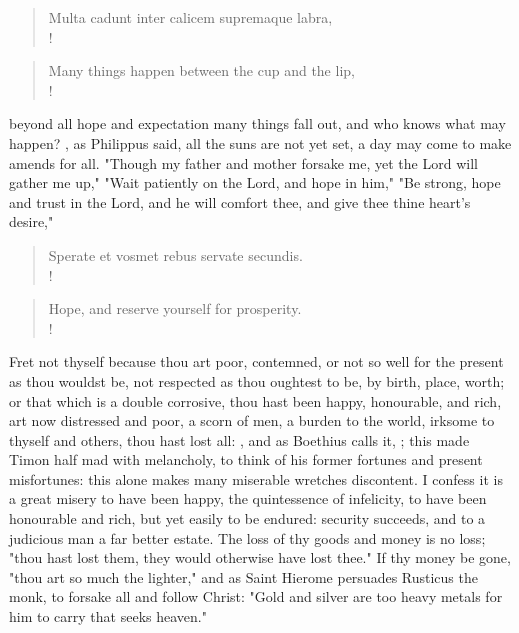 {\begin{latin}
\begin{verse}%
Multa cadunt inter calicem supremaque labra,\\!
\end{verse}%
\end{latin}



\begin{verse}%
Many things happen between the cup and the lip,\\!
\end{verse}%

beyond all hope and expectation many things fall out, and who knows what may happen? , as Philippus said, all the suns are not yet set, a day may come to make amends for all. "Though my father and mother forsake me, yet the Lord will gather me up,"  "Wait patiently on the Lord, and hope in him,"  "Be strong, hope and trust in the Lord, and he will comfort thee, and give thee thine heart's desire," 

\begin{latin}
\begin{verse}%
Sperate et vosmet rebus servate secundis.\\!
\end{verse}%
\end{latin}



\begin{verse}%
Hope, and reserve yourself for prosperity.\\!
\end{verse}%

Fret not thyself because thou art poor, contemned, or not so well for the present as thou wouldst be, not respected as thou oughtest to be, by birth, place, worth; or that which is a double corrosive, thou hast been happy, honourable, and rich, art now distressed and poor, a scorn of men, a burden to the world, irksome to thyself and others, thou hast lost all: , and as Boethius calls it, ; this made Timon half mad with melancholy, to think of his former fortunes and present misfortunes: this alone makes many miserable wretches discontent. I confess it is a great misery to have been happy, the quintessence of infelicity, to have been honourable and rich, but yet easily to be endured: security succeeds, and to a judicious man a far better estate. The loss of thy goods and money is no loss; "thou hast lost them, they would otherwise have lost thee." If thy money be gone, "thou art so much the lighter," and as Saint Hierome persuades Rusticus the monk, to forsake all and follow Christ: "Gold and silver are too heavy metals for him to carry that seeks heaven."

}
